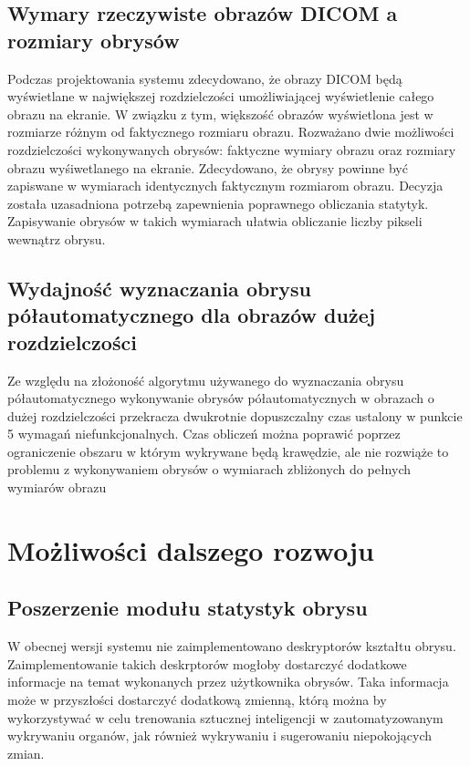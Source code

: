 \documentclass[a4paper,11pt,twoside]{report}
\theoremstyle{definition}
\begin{document}
\subsection {Wymary rzeczywiste obrazów DICOM a rozmiary obrysów}

Podczas projektowania systemu zdecydowano, że obrazy DICOM będą wyświetlane w największej rozdzielczości umożliwiającej wyświetlenie całego obrazu na ekranie. W związku z tym, większość obrazów wyświetlona jest w rozmiarze różnym od faktycznego rozmiaru obrazu. Rozważano dwie możliwości rozdzielczości wykonywanych obrysów: faktyczne wymiary obrazu oraz rozmiary obrazu wyśiwetlanego na ekranie. Zdecydowano, że obrysy powinne być zapiswane w wymiarach identycznych faktycznym rozmiarom obrazu. Decyzja została uzasadniona potrzebą zapewnienia poprawnego obliczania statytyk. Zapisywanie obrysów w takich wymiarach ułatwia obliczanie liczby pikseli wewnątrz obrysu.

\subsection {Wydajność wyznaczania obrysu półautomatycznego dla obrazów dużej rozdzielczości}

Ze względu na złożoność algorytmu używanego do wyznaczania obrysu półautomatycznego wykonywanie obrysów półautomatycznych w obrazach o dużej rozdzielczości przekracza dwukrotnie dopuszczalny czas ustalony w punkcie 5 wymagań niefunkcjonalnych. Czas obliczeń można poprawić poprzez ograniczenie obszaru w którym wykrywane będą krawędzie, ale nie rozwiąże to problemu z wykonywaniem obrysów o wymiarach zbliżonych do pełnych wymiarów obrazu

\section {Możliwości dalszego rozwoju}

\subsection {Poszerzenie modułu statystyk obrysu}

W obecnej wersji systemu nie zaimplementowano deskryptorów kształtu obrysu. Zaimplementowanie takich deskrptorów mogłoby dostarczyć dodatkowe informacje na temat wykonanych przez użytkownika obrysów. Taka informacja może w przyszłości dostarczyć dodatkową zmienną, którą można by wykorzystywać w celu trenowania sztucznej inteligencji w zautomatyzowanym wykrywaniu organów, jak również wykrywaniu i sugerowaniu niepokojących zmian.
\end{document}
